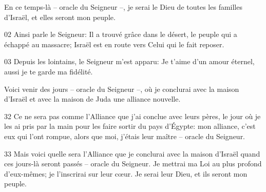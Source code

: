 En ce temps-là – oracle du Seigneur –, je serai le Dieu de toutes les familles d’Israël, et elles seront mon peuple.

02 Ainsi parle le Seigneur: Il a trouvé grâce dans le désert, le peuple qui a échappé au massacre; Israël est en route vers Celui qui le fait reposer.

03 Depuis les lointains, le Seigneur m’est apparu: Je t’aime d’un amour éternel, aussi je te garde ma fidélité.

Voici venir des jours – oracle du Seigneur –, où je conclurai avec la maison d’Israël et avec la maison de Juda une alliance nouvelle.

32 Ce ne sera pas comme l’Alliance que j’ai conclue avec leurs pères, le jour où je les ai pris par la main pour les faire sortir du pays d’Égypte: mon alliance, c’est eux qui l’ont rompue, alors que moi, j’étais leur maître – oracle du Seigneur.

33 Mais voici quelle sera l’Alliance que je conclurai avec la maison d’Israël quand ces jours-là seront passés – oracle du Seigneur. Je mettrai ma Loi au plus profond d’eux-mêmes; je l’inscrirai sur leur cœur. Je serai leur Dieu, et ils seront mon peuple.